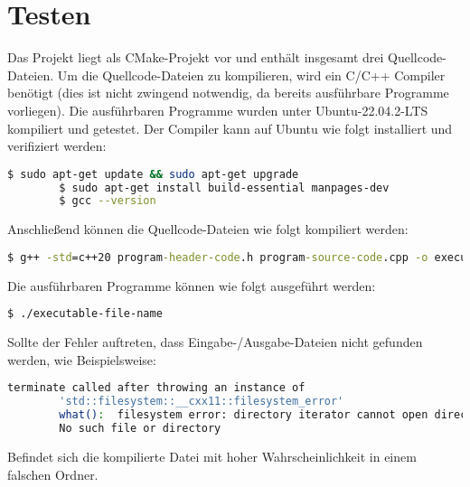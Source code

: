 \documentclass[a4paper,10pt,ngerman]{scrartcl}
\begin{document}
    \section{Testen}\label{sec:testen}
    Das Projekt liegt als CMake-Projekt vor und enthält insgesamt drei Quellcode-Dateien.
    Um die Quellcode-Dateien zu kompilieren, wird ein C/C++ Compiler benötigt
    (dies ist nicht zwingend notwendig, da bereits ausführbare Programme vorliegen).
    Die ausführbaren Programme wurden unter Ubuntu-22.04.2-LTS kompiliert und getestet.
    \newpage
    Der Compiler kann auf Ubuntu wie folgt installiert und verifiziert werden:
    \begin{lstlisting}[language=bash,label={lst:install}]
        $ sudo apt-get update && sudo apt-get upgrade
        $ sudo apt-get install build-essential manpages-dev
        $ gcc --version
    \end{lstlisting}
    Anschließend können die Quellcode-Dateien wie folgt kompiliert werden:
    \begin{lstlisting}[language=cmd,label={lst:compile}]
        $ g++ -std=c++20 program-header-code.h program-source-code.cpp -o executable-file-name
    \end{lstlisting}
    Die ausführbaren Programme können wie folgt ausgeführt werden:
    \begin{lstlisting}[language=bash,label={lst:run}]
        $ ./executable-file-name
    \end{lstlisting}
    Sollte der Fehler auftreten, dass Eingabe-/Ausgabe-Dateien nicht gefunden werden,
    wie Beispielsweise:
    \begin{lstlisting}[language=bash,label={lst:error}]
        terminate called after throwing an instance of
        'std::filesystem::__cxx11::filesystem_error'
        what():  filesystem error: directory iterator cannot open directory:
        No such file or directory
    \end{lstlisting}
    Befindet sich die kompilierte Datei mit hoher Wahrscheinlichkeit in einem falschen Ordner.
\end{document}
